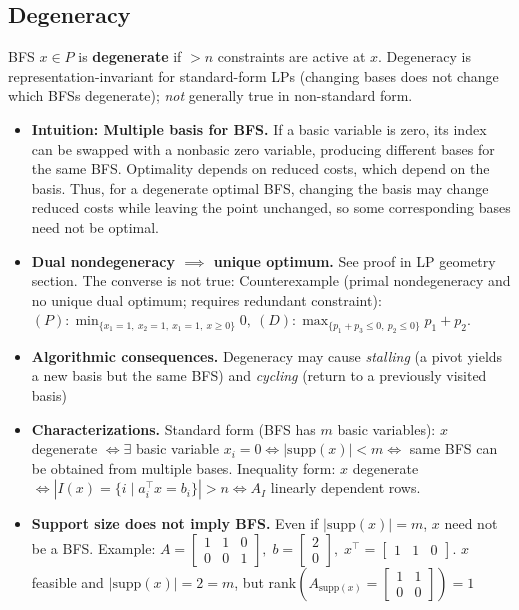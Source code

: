 \documentclass{article}
\begin{document}
\subsection{Degeneracy}

BFS $x\in P$ is \textbf{degenerate} if $>n$ constraints are active at $x$.   
Degeneracy is representation-invariant for standard-form LPs (changing bases does not change which BFSs degenerate); \emph{not} generally true in non-standard form.

\begin{itemize}
    \item \textbf{Intuition: Multiple basis for BFS.}
    If a basic variable is zero, its index can be swapped with a nonbasic zero variable, producing different bases for the same BFS. 
    Optimality depends on reduced costs, which depend on the basis. 
    Thus, for a degenerate optimal BFS, changing the basis may change reduced costs while leaving the point unchanged, so some corresponding bases need not be optimal.
    
    
    \item \textbf{Dual nondegeneracy $\implies$ unique optimum.} See proof in LP geometry section. The converse is not true: Counterexample (primal nondegeneracy and no unique dual optimum; requires redundant constraint): $(P):\min_{\{x_1=1,\ x_2=1,\ x_1=1,\ x\geq0\}}0,\ (D):\max_{\{p_1 + p_3\leq0,\ p_2\leq0\}}p_1 + p_2$. 
    
    \item \textbf{Algorithmic consequences.}
    Degeneracy may cause \emph{stalling} (a pivot yields a new basis but the same BFS) and \emph{cycling} (return to a previously visited basis)

    \item \textbf{Characterizations.}
    Standard form (BFS has $m$ basic variables): $x$ degenerate $\iff \exists$ basic variable $x_i = 0 \iff |\mathrm{supp}(x)| < m \iff$ same BFS can be obtained from multiple bases. 
    Inequality form: $x$ degenerate $\iff |I(x)=\{i\mid a_i^\top x = b_i\}| > n \iff A_I$ linearly dependent rows.


    \item \textbf{Support size does not imply BFS.}
    Even if $|\mathrm{supp}(x)|=m$, $x$ need not be a BFS.  
    Example: $A=\begin{bmatrix}1&1&0\\0&0&1\end{bmatrix},\; b=\begin{bmatrix}2\\0\end{bmatrix},\;x^\top=\begin{bmatrix}1&1&0\end{bmatrix}$. 
    $x$ feasible and $|\mathrm{supp}(x)|=2=m$, but rank$\left(A_{\mathrm{supp}(x)}=\begin{bmatrix}1&1\\0&0\end{bmatrix}\right)=1$
\end{itemize}
\end{document}
